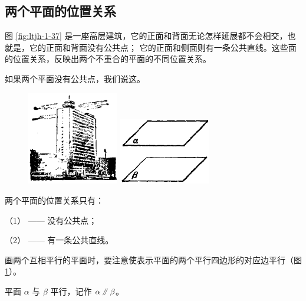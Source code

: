 \subsection{两个平面的位置关系}\label{subsec:1-12}

图 \ref{fig:ltjh-1-37} 是一座高层建筑，它的正面和背面无论怎样延展都不会相交，也就是，它的正面和背面没有公共点；
它的正面和侧面则有一条公共直线。这些面的位置关系，反映出两个不重合的平面的不同位置关系。

如果两个平面没有公共点，我们说这。

\begin{figure}[htbp]
    \centering
    \begin{minipage}[b]{7cm}
        \centering
        \includegraphics[width=4cm]{../pic/ltjh-ch1-37.png}
        \caption{}\label{fig:ltjh-1-37}
    \end{minipage}
    \qquad
    \begin{minipage}[b]{7cm}
        \centering
        \includegraphics[width=4cm]{../pic/ltjh-ch1-38.png}
        \caption{}\label{fig:ltjh-1-38}
    \end{minipage}
\end{figure}


两个平面的位置关系只有：

（1） —— 没有公共点；

（2） —— 有一条公共直线。

画两个互相平行的平面时，要注意使表示平面的两个平行四边形的对应边平行（图 \ref{fig:ltjh-1-38}）。

平面 $\alpha$ 与 $\beta$ 平行，记作 $\alpha \pingxing \beta$。


\begin{lianxi}



\end{lianxi}

